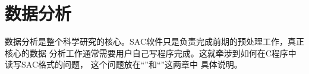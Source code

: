\section{数据分析}
数据分析是整个科学研究的核心。SAC软件只是负责完成前期的预处理工作，真正核心的数据
分析工作通常需要用户自己写程序完成。这就牵涉到如何在C程序中读写SAC格式的问题，
这个问题放在``''和``''这两章中
具体说明。

